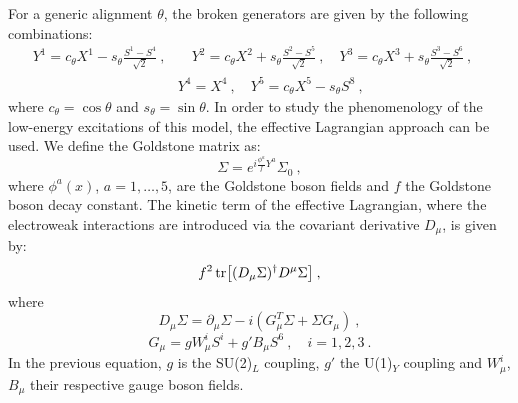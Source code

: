 For a generic alignment $\theta$, the broken generators are given by the following combinations: 
\begin{equation}
\begin{split}
Y^1 = c_{\theta} X^1 - s_{\theta} \frac{S^1-S^4}{\sqrt  2} \: , & \quad Y^2 = c_{\theta} X^2 + s_{\theta} \frac{S^2-S^5}{\sqrt  2} \: , \quad Y^3 = c_{\theta} X^3 + s_{\theta} \frac{S^3-S^6}{\sqrt  2} \: , \quad \\
& Y^4 = X^4 \: ,  \quad  Y^5 = c _{\theta} X^5 - s_{\theta} S^8  \: ,
\end{split}
\end{equation}
%
where $c _{\theta} = \cos \theta$ and $s _{\theta} = \sin \theta$. 
In order to study the phenomenology of the low-energy excitations of this model, the effective Lagrangian approach can be used. We define the Goldstone matrix as:
\begin{equation}
\Sigma = e^{i \frac{\phi^a}{f} Y^a} \Sigma_0 \: ,
\end{equation}
%
where $\phi^a(x)$, $a = 1, \dots , 5$, are the Goldstone boson fields and $f$ the Goldstone boson decay constant.
The kinetic term of the effective Lagrangian, where the electroweak interactions are introduced via the covariant derivative $D_{\mu}$, is given by:
\begin{equation}
f^2 \tr [(D_{\mu} \Sigma)^{\dagger} D^{\mu} \Sigma ] \: ,
\label{eff_lagrangian}
\end{equation}
%
where
\begin{equation}
D_{\mu} \Sigma = \partial_{\mu} \Sigma -i (G_{\mu}^T \Sigma + \Sigma G_{\mu}) \: ,
\end{equation}
\begin{equation}
G_{\mu} = g W^i_{\mu} S^i + g' B_{\mu} S^6 \: , \quad i = 1,2,3 \: .
\end{equation}
%
In the previous equation, $g$ is the SU(2)$_L$ coupling, $g'$ the U(1)$_Y$ coupling and $W^i_{\mu}$, $B_{\mu}$ their respective gauge boson fields.

